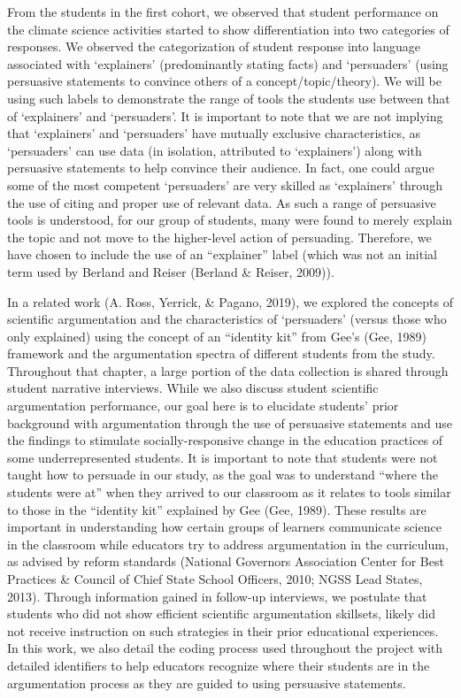 \documentclass[11.5pt]{sig-alternate} %
\begin{document}
\begin{large}
From the students in the first cohort, we observed that student performance on the climate science activities started to show differentiation into two categories of responses. We observed the categorization of student response into language associated with ‘explainers’ (predominantly stating facts) and ‘persuaders’ (using persuasive statements to convince others of a concept/topic/theory). We will be using such labels to demonstrate the range of tools the students use between that of ‘explainers’ and ‘persuaders’. It is important to note that we are not implying that ‘explainers’ and ‘persuaders’ have mutually exclusive characteristics, as ‘persuaders’ can use data (in isolation, attributed to ‘explainers’) along with persuasive statements to help convince their audience. In fact, one could argue some of the most competent ‘persuaders’ are very skilled as ‘explainers’ through the use of citing and proper use of relevant data. As such a range of persuasive tools is understood, for our group of students, many were found to merely explain the topic and not move to the higher-level action of persuading. Therefore, we have chosen to include the use of an “explainer” label (which was not an initial term used by Berland and Reiser (Berland \& Reiser, 2009)). 

In a related work (A. Ross, Yerrick, \& Pagano, 2019), we explored the concepts of scientific argumentation and the characteristics of ‘persuaders’ (versus those who only explained) using the concept of an “identity kit” from Gee’s (Gee, 1989) framework and the argumentation spectra of different students from the study. Throughout that chapter, a large portion of the data collection is shared through student narrative interviews. While we also discuss student scientific argumentation performance, our goal here is to elucidate students’ prior background with argumentation through the use of persuasive statements and use the findings to stimulate socially-responsive change in the education practices of some underrepresented students. It is important to note that students were not taught how to persuade in our study, as the goal was to understand “where the students were at” when they arrived to our classroom as it relates to tools similar to those in the “identity kit” explained by Gee (Gee, 1989). These results are important in understanding how certain groups of learners communicate science in the classroom while educators try to address argumentation in the curriculum, as advised by reform standards (National Governors Association Center for Best Practices \& Council of Chief State School Officers, 2010; NGSS Lead States, 2013). Through information gained in follow-up interviews, we postulate that students who did not show efficient scientific argumentation skillsets, likely did not receive instruction on such strategies in their prior educational experiences. In this work, we also detail the coding process used throughout the project with detailed identifiers to help educators recognize where their students are in the argumentation process as they are guided to using persuasive statements. 


\end{large}
\end{document}
